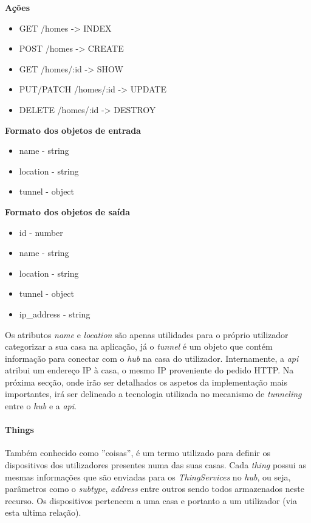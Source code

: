 \textbf{Ações}
\begin{itemize}
    \item GET /homes -> INDEX
    \item POST /homes -> CREATE
    \item GET /homes/:id -> SHOW
    \item PUT/PATCH /homes/:id -> UPDATE
    \item DELETE /homes/:id -> DESTROY
\end{itemize}

\textbf{Formato dos objetos de entrada}
\begin{itemize}
    \item name - string
    \item location - string
    \item tunnel - object
\end{itemize}

\textbf{Formato dos objetos de saída}
\begin{itemize}
    \item id - number
    \item name - string
    \item location - string
    \item tunnel - object
    \item ip{\_}address - string
\end{itemize}

Os atributos \textit{name} e \textit{location} são apenas utilidades para o próprio utilizador categorizar a sua casa na aplicação, já o \textit{tunnel} é um objeto que contém informação para conectar com o \textit{hub} na casa do utilizador. Internamente, a \textit{api} atribui um endereço IP à casa, o mesmo IP proveniente do pedido HTTP. Na próxima secção, onde irão ser detalhados os aspetos da implementação mais importantes, irá ser delineado a tecnologia utilizada no mecanismo de \textit{tunneling} entre o \textit{hub} e a \textit{api}.

\paragraph*{Things}

Também conhecido como ''coisas'', é um termo utilizado para definir os dispositivos dos utilizadores presentes numa das suas casas. Cada \textit{thing} possui as mesmas informações que são enviadas para os \textit{ThingServices} no \textit{hub}, ou seja, parâmetros como o \textit{subtype}, \textit{address} entre outros sendo todos armazenados neste recurso. Os dispositivos pertencem a uma casa e portanto a um utilizador (via esta ultima relação).

